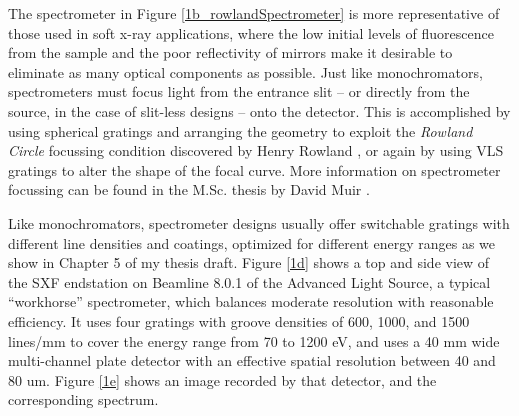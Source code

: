 The spectrometer in Figure \ref{1b_rowlandSpectrometer} is more representative of those used in soft x-ray applications, where the low initial levels of fluorescence from the sample and the poor reflectivity of mirrors make it desirable to eliminate as many optical components as possible.  Just like monochromators, spectrometers must focus light from the entrance slit -- or directly from the source, in the case of slit-less designs -- onto the detector.  This is accomplished by using spherical gratings and arranging the geometry to exploit the \emph{Rowland Circle} focussing condition discovered by Henry Rowland \cite[p.~169]{Pea97}, or again by using VLS gratings to alter the shape of the focal curve.  More information on spectrometer focussing can be found in the M.Sc. thesis by David Muir \cite{Mui06}.

Like monochromators, spectrometer designs usually offer switchable gratings with different line densities and coatings, optimized for different energy ranges as we show in Chapter 5 of my thesis draft.  Figure \ref{1d} shows a top and side view of the SXF endstation on Beamline 8.0.1 of the Advanced Light Source, a typical ``workhorse'' spectrometer, which balances moderate resolution with reasonable efficiency.  It uses four gratings with groove densities of 600, 1000, and 1500 lines/mm to cover the energy range from 70 to 1200 eV, and uses a 40 mm wide multi-channel plate detector with an effective spatial resolution between 40 and 80 um.  Figure \ref{1e} shows an image recorded by that detector, and the corresponding spectrum.

